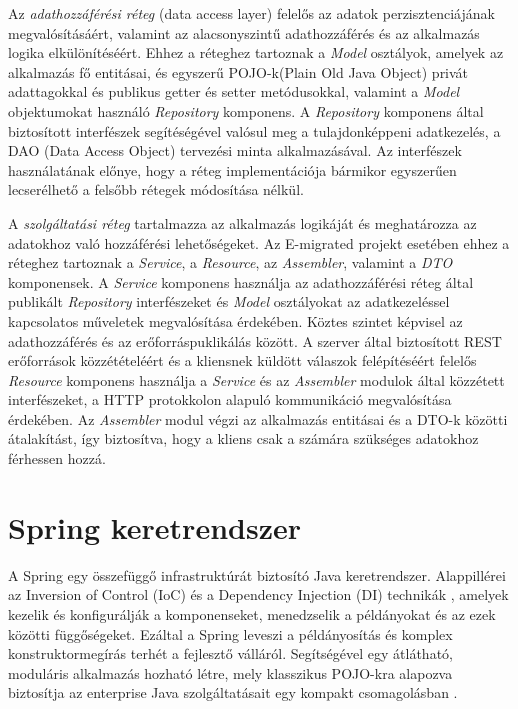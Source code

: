 Az \textsl{adathozzáférési réteg} (data access layer) felelős az adatok perzisztenciájának megvalósításáért, valamint az alacsonyszintű adathozzáférés és az alkalmazás logika elkülönítéséért. Ehhez a réteghez tartoznak a \textsl{Model} osztályok, amelyek az alkalmazás fő entitásai, és egyszerű POJO-k(Plain Old Java Object)\cite{POJO}  privát adattagokkal és publikus getter és setter metódusokkal, valamint a \textsl{Model} objektumokat használó \textsl{Repository} komponens. A \textsl{Repository} komponens  által biztosított interfészek segítéségével valósul meg a tulajdonképpeni adatkezelés, a DAO (Data Access Object)\cite{DAO} tervezési minta alkalmazásával. Az interfészek használatának előnye, hogy a réteg implementációja bármikor egyszerűen lecserélhető a felsőbb rétegek módosítása nélkül. 

A \textsl{szolgáltatási réteg} tartalmazza az alkalmazás logikáját és meghatározza az adatokhoz való hozzáférési lehetőségeket. Az E-migrated projekt esetében ehhez a réteghez tartoznak a \textsl{Service}, a \textsl{Resource}, az \textsl{Assembler}, valamint a \textsl{DTO} komponensek. A \textsl{Service} komponens használja az adathozzáférési réteg által publikált \textsl{Repository} interfészeket és \textsl{Model} osztályokat az adatkezeléssel kapcsolatos műveletek megvalósítása érdekében. Köztes szintet képvisel az adathozzáférés és az erőforráspuklikálás között. A szerver által biztosított REST erőforrások közzétételéért és a kliensnek küldött válaszok felépítéséért felelős \textsl{Resource} komponens használja a  \textsl{Service} és az \textsl{Assembler} modulok által közzétett interfészeket, a HTTP protokkolon alapuló kommunikáció megvalósítása érdekében. Az \textsl{Assembler} modul végzi az alkalmazás entitásai és a DTO-k közötti átalakítást, így biztosítva, hogy a kliens csak a számára szükséges adatokhoz férhessen hozzá. 




\section{Spring keretrendszer}
\label{subsec:Spring}

A Spring egy összefüggő infrastruktúrát biztosító Java keretrendszer.  Alappillérei az Inversion of Control (IoC) és a Dependency Injection (DI) technikák \cite{IoCDI}, amelyek kezelik és konfigurálják a komponenseket, menedzselik a példányokat és az ezek közötti függőségeket. Ezáltal a Spring leveszi a példányosítás és komplex konstruktormegírás terhét a fejlesztő válláról. Segítségével egy átlátható, moduláris alkalmazás hozható létre, mely klasszikus POJO-kra alapozva biztosítja az enterprise Java szolgáltatásait egy kompakt csomagolásban \cite{Spring}. 

